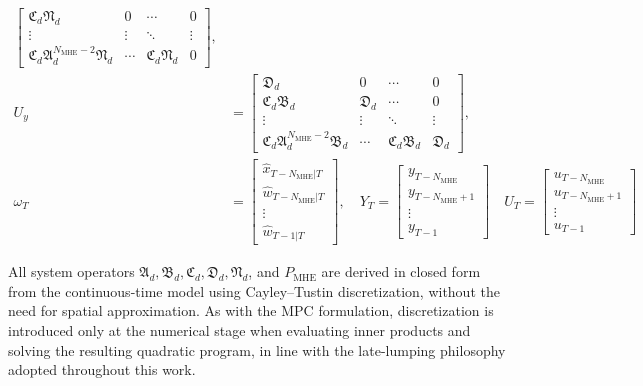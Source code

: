 \begin{equation}
\begin{aligned}
\begin{bmatrix}
        \mathfrak{C}_d \mathfrak{N}_d & 0 & \cdots & 0 \\
        \vdots & \vdots & \ddots & \vdots \\
        \mathfrak{C}_d \mathfrak{A}_d^{{N_{\mathrm{MHE}}}-2} \mathfrak{N}_d & \cdots & \mathfrak{C}_d \mathfrak{N}_d & 0
        \end{bmatrix}, \\[1ex]
        U_y &=
        \begin{bmatrix}
        \mathfrak{D}_d & 0 & \cdots & 0 \\
        \mathfrak{C}_d \mathfrak{B}_d & \mathfrak{D}_d & \cdots & 0 \\
        \vdots & \vdots & \ddots & \vdots \\
        \mathfrak{C}_d \mathfrak{A}_d^{{N_{\mathrm{MHE}}}-2} \mathfrak{B}_d & \cdots & \mathfrak{C}_d \mathfrak{B}_d & \mathfrak{D}_d
        \end{bmatrix}, \\[1ex]
        \omega_T &=
        \left[
        \begin{array}{c}
        \hat{x}_{T-N_{\mathrm{MHE}}|T} \\
        \hline
        \hat{w}_{T-N_{\mathrm{MHE}}|T} \\
        \vdots \\
        \hat{w}_{T-1|T}
        \end{array}
        \right], \quad
        Y_T =
        \begin{bmatrix}
        y_{T-{N_{\mathrm{MHE}}}} \\
        y_{T-{N_{\mathrm{MHE}}}+1} \\
        \vdots \\
        y_{T-1}
        \end{bmatrix} \quad 
        U_T =
        \begin{bmatrix}
        u_{T-{N_{\mathrm{MHE}}}} \\
        u_{T-{N_{\mathrm{MHE}}}+1} \\
        \vdots \\
        u_{T-1}
        \end{bmatrix}
    \end{aligned}
\end{equation}


All system operators $\mathfrak{A}_d, \mathfrak{B}_d, \mathfrak{C}_d, \mathfrak{D}_d, \mathfrak{N}_d$, and $P_{\mathrm{MHE}}$ are derived in closed form from the continuous-time model using Cayley--Tustin discretization, without the need for spatial approximation. As with the MPC formulation, discretization is introduced only at the numerical stage when evaluating inner products and solving the resulting quadratic program, in line with the late-lumping philosophy adopted throughout this work.

